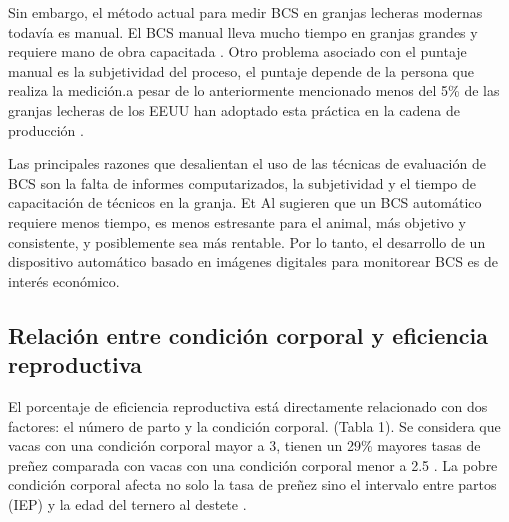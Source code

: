 Sin embargo, el método actual para medir BCS en granjas lecheras modernas todavía es manual. El BCS manual lleva mucho tiempo en granjas grandes y requiere mano de obra capacitada \cite{Halachmi2013AutomaticImaging}. Otro problema asociado con el puntaje manual es la subjetividad del proceso, el puntaje depende de la persona que realiza la medición.a pesar de lo anteriormente mencionado  menos del 5\% de las granjas lecheras de los EEUU han adoptado esta práctica en la cadena de producción \cite{Azzaro2011ObjectiveImages}.

Las principales razones que desalientan el uso de las técnicas de evaluación de BCS son la falta de informes computarizados, la  subjetividad y el tiempo de capacitación de técnicos en la granja. Et Al \cite{Schroder2006InvitedThickness} sugieren que un BCS automático requiere menos tiempo, es menos estresante para el animal, más objetivo y consistente, y posiblemente sea más rentable. Por lo tanto, el desarrollo de un dispositivo automático basado en imágenes digitales para monitorear BCS es de interés económico.

\vspace{5mm} %
\subsection{Relación entre condición corporal y eficiencia reproductiva}

El porcentaje de eficiencia reproductiva está directamente relacionado con dos factores: el número de parto y la condición corporal.  (Tabla 1). Se considera que vacas con una condición corporal mayor a 3, tienen un 29\% mayores tasas de preñez  comparada con vacas con una condición corporal menor a 2.5 \cite{RelacionHolstein}. La pobre condición corporal afecta no solo la tasa de preñez sino el intervalo entre partos (IEP) y la edad del ternero al destete \cite{RelacionHolstein}.

\vspace{5mm} %